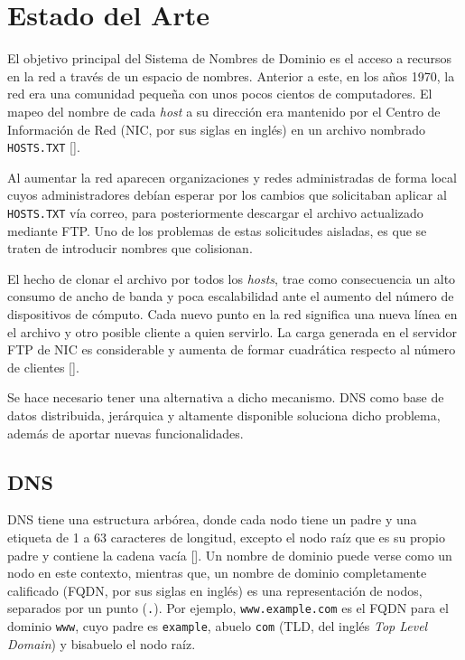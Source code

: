 \chapter{Estado del Arte}\label{chapter:state-of-the-art}

El objetivo principal del Sistema de Nombres de Dominio es el acceso a recursos en la red a través de un espacio de nombres. Anterior a este, en los años 1970, la red era una comunidad pequeña con unos pocos cientos de computadores. El mapeo del nombre de cada \textit{host} a su dirección era mantenido por el Centro de Información de Red (NIC, por sus siglas en inglés) en un archivo nombrado \verb+HOSTS.TXT+ [\cite{rfc_1034}].

Al aumentar la red aparecen organizaciones y redes administradas de forma local cuyos administradores debían esperar por los cambios que solicitaban aplicar al \verb|HOSTS.TXT| vía correo, para posteriormente descargar el archivo actualizado mediante FTP. Uno de los problemas de estas solicitudes aisladas, es que se traten de introducir nombres que colisionan. 


El hecho de clonar el archivo por todos los \textit{hosts}, trae como consecuencia un alto consumo de ancho de banda y poca escalabilidad ante el aumento del número de dispositivos de cómputo. Cada nuevo punto en la red significa una nueva línea en el archivo y otro posible cliente a quien servirlo. La carga generada en el servidor FTP de NIC es considerable y aumenta de formar cuadrática respecto al número de clientes [\cite{rfc_1034}].

Se hace necesario tener una alternativa a dicho mecanismo. DNS como base de datos distribuida, jerárquica y altamente disponible soluciona dicho problema, además de aportar nuevas funcionalidades.

\section{DNS}

DNS tiene una estructura arbórea, donde cada nodo tiene un padre y una etiqueta de 1 a 63 caracteres de longitud, excepto el nodo raíz que es su propio padre y contiene la cadena vacía [\cite{Vixie_2007}]. Un nombre de dominio puede verse como un nodo en este contexto, mientras que, un nombre de dominio completamente calificado (FQDN, por sus siglas en inglés) es una representación de nodos, separados por un punto (\verb+.+). Por ejemplo, \verb+www.example.com+ es el FQDN para el dominio \verb+www+, cuyo padre es \verb+example+, abuelo \verb+com+ (TLD, del inglés \textit{Top Level Domain}) y bisabuelo el nodo raíz.


